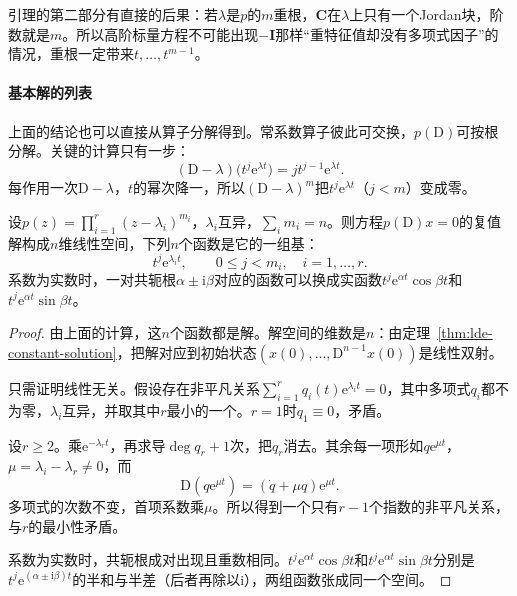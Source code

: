 引理的第二部分有直接的后果：若$\lambda$是$p$的$m$重根，$\bm{C}$在$\lambda$上只有一个Jordan块，阶数就是$m$。所以高阶标量方程不可能出现$-\bm{I}$那样“重特征值却没有多项式因子”的情况，重根一定带来$t,\ldots,t^{m-1}$。

\paragraph{基本解的列表}
上面的结论也可以直接从算子分解得到。常系数算子彼此可交换，$p(\mathrm{D})$可按根分解。关键的计算只有一步：
\[
 (\mathrm{D}-\lambda)\bigl(t^j\mathrm{e}^{\lambda t}\bigr)=jt^{j-1}\mathrm{e}^{\lambda t}.
\]
每作用一次$\mathrm{D}-\lambda$，$t$的幂次降一，所以$(\mathrm{D}-\lambda)^m$把$t^j\mathrm{e}^{\lambda t}$（$j<m$）变成零。

\begin{theorem}[高阶齐次方程的基本解]
\label{thm:lde-high-order-basis}
设$p(z)=\prod_{i=1}^{r}(z-\lambda_i)^{m_i}$，$\lambda_i$互异，$\sum_im_i=n$。则方程$p(\mathrm{D})x=0$的复值解构成$n$维线性空间，下列$n$个函数是它的一组基：
\begin{equation}
 t^j\mathrm{e}^{\lambda_it},\qquad 0\leq j<m_i,\quad i=1,\ldots,r.
 \label{eq:lde-high-order-basis}
\end{equation}
系数为实数时，一对共轭根$\alpha\pm\mathrm{i}\beta$对应的函数可以换成实函数$t^j\mathrm{e}^{\alpha t}\cos\beta t$和$t^j\mathrm{e}^{\alpha t}\sin\beta t$。
\end{theorem}

\begin{proof}
由上面的计算，这$n$个函数都是解。解空间的维数是$n$：由定理~\ref{thm:lde-constant-solution}，把解对应到初始状态$(x(0),\ldots,\mathrm{D}^{n-1}x(0))$是线性双射。

只需证明线性无关。假设存在非平凡关系$\sum_{i=1}^{r}q_i(t)\mathrm{e}^{\lambda_it}=0$，其中多项式$q_i$都不为零，$\lambda_i$互异，并取其中$r$最小的一个。$r=1$时$q_1\equiv0$，矛盾。

设$r\geq2$。乘$\mathrm{e}^{-\lambda_rt}$，再求导$\deg q_r+1$次，把$q_r$消去。其余每一项形如$q\mathrm{e}^{\mu t}$，$\mu=\lambda_i-\lambda_r\neq0$，而
\[
 \mathrm{D}(q\mathrm{e}^{\mu t})=(\dot{q}+\mu q)\mathrm{e}^{\mu t}.
\]
多项式的次数不变，首项系数乘$\mu$。所以得到一个只有$r-1$个指数的非平凡关系，与$r$的最小性矛盾。

系数为实数时，共轭根成对出现且重数相同。$t^j\mathrm{e}^{\alpha t}\cos\beta t$和$t^j\mathrm{e}^{\alpha t}\sin\beta t$分别是$t^j\mathrm{e}^{(\alpha\pm\mathrm{i}\beta)t}$的半和与半差（后者再除以$\mathrm{i}$），两组函数张成同一个空间。
\end{proof}

